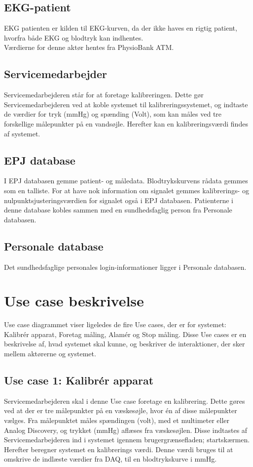 \subsection{EKG-patient}
EKG patienten er kilden til EKG-kurven, da der ikke haves en rigtig patient, hvorfra både EKG og blodtryk kan indhentes.\\
Værdierne for denne aktør hentes fra PhysioBank ATM.
\subsection{Servicemedarbejder}
Servicemedarbejderen står for at foretage kalibreringen. Dette gør Servicemedarbejderen ved at koble systemet til kalibreringssystemet, og indtaste de værdier for tryk (mmHg) og spænding (Volt), som kan måles ved tre forskellige målepunkter på en vandsøjle. Herefter kan en kalibreringsværdi findes af systemet.
\subsection{EPJ database}
I EPJ databasen gemme patient- og måledata. Blodtrykskurvens rådata gemmes som en talliste. For at have nok information om signalet gemmes kalibrerings- og nulpunktsjusteringsværdien for signalet også i EPJ databasen. Patienterne i denne database kobles sammen med en sundhedsfaglig person fra Personale databasen. 
\subsection{Personale database}
Det sundhedsfaglige personales login-informationer ligger i Personale databasen. 
\section{Use case beskrivelse}
Use case diagrammet viser ligeledes de fire Use cases, der er for systemet: Kalibrér apparat, Foretag måling, Alamér og Stop måling. Disse Use cases er en beskrivelse af, hvad systemet skal kunne, og beskriver de interaktioner, der sker mellem aktørerne og systemet.
\\
\subsection{Use case 1: Kalibrér apparat}
Servicemedarbejderen skal i denne Use case foretage en kalibrering. Dette gøres ved at der er tre målepunkter på en væskesøjle, hvor én af disse målepunkter vælges. Fra målepunktet måles spændingen (volt), med et multimeter eller Analog Discovery, og trykket (mmHg) aflæses fra væskesøjlen. Disse indtastes af Servicemedarbejderen ind i systemet igennem brugergrænsefladen; startskærmen. Herefter beregner systemet en kalibrerings værdi. Denne værdi bruges til at omskrive de indlæste værdier fra DAQ, til en blodtrykskurve i mmHg.
